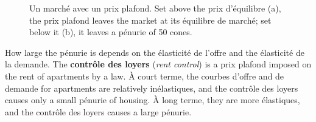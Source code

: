 \begin{figure}[h!]
  \caption*{\small Un marché avec un prix plafond. Set above the prix d'équilibre
  (a), the prix plafond leaves the market at its équilibre de marché; set below it
  (b), it
  leaves a pénurie of 50 cones.}
\end{figure}

How large the pénurie is depends on the élasticité de l'offre and the élasticité de
la demande. The
\textbf{contrôle des loyers} (\textit{rent control}) is a prix plafond imposed on
the rent of apartments by a law. À court terme, the courbes d'offre and de demande
for apartments are relatively inélastiques, and the contrôle des loyers causes only
a small pénurie of housing. À long terme, they are more élastiques, and the
contrôle des loyers causes a large pénurie.

